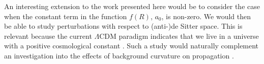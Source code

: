 An interesting extension to the work presented here would be to consider the case when the constant term in the function $f(R)$, $a_0$, is non-zero. We would then be able to study perturbations with respect to (anti-)de Sitter space. This is relevant because the current $\Lambda$CDM paradigm indicates that we live in a universe with a positive cosmological constant \citep{Jarosik2011, Komatsu2011}. Such a study would naturally complement an investigation into the effects of background curvature on propagation \citep{Yang2011}.
